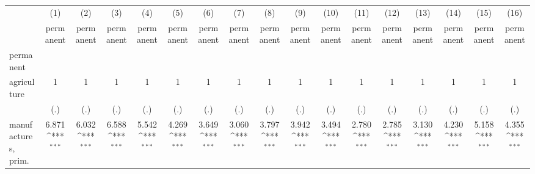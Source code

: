 {
\def\sym#1{\ifmmode^{#1}\else\(^{#1}\)\fi}
\begin{tabular}{l*{16}{c}}
\hline\hline
                    &\multicolumn{1}{c}{(1)}&\multicolumn{1}{c}{(2)}&\multicolumn{1}{c}{(3)}&\multicolumn{1}{c}{(4)}&\multicolumn{1}{c}{(5)}&\multicolumn{1}{c}{(6)}&\multicolumn{1}{c}{(7)}&\multicolumn{1}{c}{(8)}&\multicolumn{1}{c}{(9)}&\multicolumn{1}{c}{(10)}&\multicolumn{1}{c}{(11)}&\multicolumn{1}{c}{(12)}&\multicolumn{1}{c}{(13)}&\multicolumn{1}{c}{(14)}&\multicolumn{1}{c}{(15)}&\multicolumn{1}{c}{(16)}\\
                    &\multicolumn{1}{c}{permanent}&\multicolumn{1}{c}{permanent}&\multicolumn{1}{c}{permanent}&\multicolumn{1}{c}{permanent}&\multicolumn{1}{c}{permanent}&\multicolumn{1}{c}{permanent}&\multicolumn{1}{c}{permanent}&\multicolumn{1}{c}{permanent}&\multicolumn{1}{c}{permanent}&\multicolumn{1}{c}{permanent}&\multicolumn{1}{c}{permanent}&\multicolumn{1}{c}{permanent}&\multicolumn{1}{c}{permanent}&\multicolumn{1}{c}{permanent}&\multicolumn{1}{c}{permanent}&\multicolumn{1}{c}{permanent}\\
\hline
permanent           &                     &                     &                     &                     &                     &                     &                     &                     &                     &                     &                     &                     &                     &                     &                     &                     \\
agriculture         &           1         &           1         &           1         &           1         &           1         &           1         &           1         &           1         &           1         &           1         &           1         &           1         &           1         &           1         &           1         &           1         \\
                    &         (.)         &         (.)         &         (.)         &         (.)         &         (.)         &         (.)         &         (.)         &         (.)         &         (.)         &         (.)         &         (.)         &         (.)         &         (.)         &         (.)         &         (.)         &         (.)         \\
[1em]
manufactures, prim. &       6.871\sym{***}&       6.032\sym{***}&       6.588\sym{***}&       5.542\sym{***}&       4.269\sym{***}&       3.649\sym{***}&       3.060\sym{***}&       3.797\sym{***}&       3.942\sym{***}&       3.494\sym{***}&       2.780\sym{***}&       2.785\sym{***}&       3.130\sym{***}&       4.230\sym{***}&       5.158\sym{***}&       4.355\sym{***}\\

\end{tabular}}

